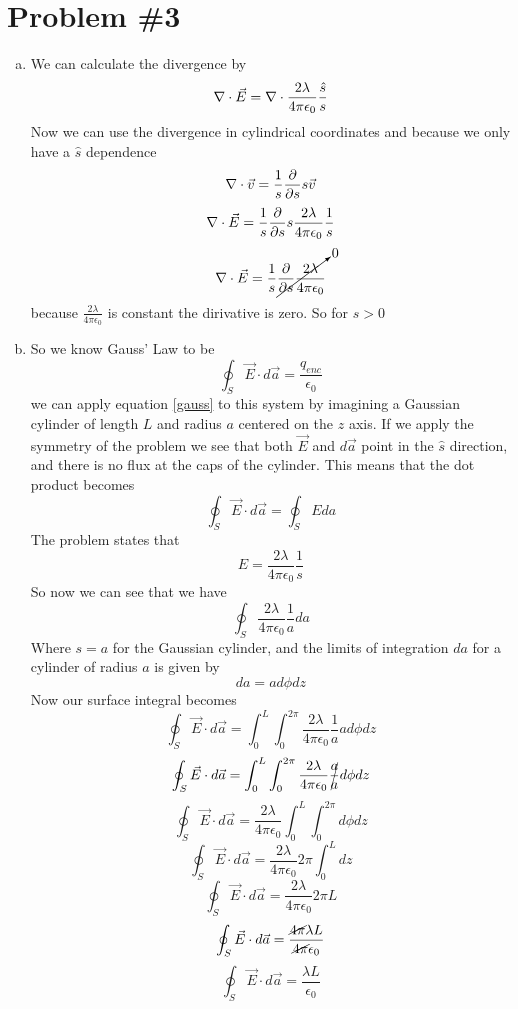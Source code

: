 \documentclass[11pt]{article}
\numberwithin{equation}{section}
\newcommand{\grad}{\bold\nabla}
\begin{document}
\section{Problem \#3}
\begin{enumerate}[(a)]
\item 
We can calculate the divergence by
$$\grad \cdot \vec{E} = \grad \cdot \frac{2\lambda}{4\pi\epsilon_0}\frac{\hat{s}}{s}$$
Now we can use the divergence in cylindrical coordinates and because we only have a $\hat{s}$ dependence 
$$\grad \cdot \vec{v} =  \frac{1}{s} \frac{\partial}{\partial s} s \vec{v}$$
$$\grad \cdot \vec{E} = \frac{1}{s}\frac{\partial}{\partial s}s \frac{2\lambda}{4\pi\epsilon_0}\frac{1}{s}$$
$$\grad \cdot \vec{E} = \frac{1}{s}\cancelto{0}{\frac{\partial}{\partial s} \frac{2\lambda}{4\pi\epsilon_0}}$$
because $\frac{2\lambda}{4\pi\epsilon_0}$ is constant the dirivative is zero. So for $s > 0$ 
\begin{center}
\fbox{$\grad \cdot \vec{E} = 0$}
\end{center}

\item 
So we know Gauss' Law to be
\begin{equation}
\oint_S \vec{E} \cdot d\vec{a} = \frac{q_{enc}}{\epsilon_0}
\label{gauss}
\end{equation}
we can apply equation \ref{gauss} to this system by imagining a Gaussian cylinder of length $L$ and radius $a$ centered on the $z$ axis. If we apply the symmetry of the problem we see that both $\vec{E}$ and $d\vec{a}$ point in the $\hat{s}$ direction, and there is no flux at the caps of the cylinder. This means that the dot product becomes
$$\oint_S \vec{E} \cdot d\vec{a} = \oint_S E da$$
The problem states that 
$$E = \frac{2\lambda}{4\pi \epsilon_0} \frac{1}{s}$$ 
So now we can see that we have
$$\oint_S \frac{2\lambda}{4\pi \epsilon_0} \frac{1}{a} da$$ 
Where $s=a$ for the Gaussian cylinder, and the limits of integration $da$ for a cylinder of radius $a$ is given by
$$da = ad\phi dz$$
Now our surface integral becomes
$$\oint_S \vec{E} \cdot d\vec{a} = \int_{0}^{L}\int_0^{2\pi} \frac{2\lambda}{4\pi \epsilon_0} \frac{1}{a} ad\phi dz$$
$$\oint_S \vec{E} \cdot d\vec{a} =\int_{0}^{L}\int_0^{2\pi} \frac{2\lambda}{4\pi \epsilon_0} \cancel{\frac{a}{a}} d\phi dz$$
$$\oint_S \vec{E} \cdot d\vec{a} =\frac{2\lambda}{4\pi \epsilon_0}\int_{0}^{L}\int_0^{2\pi}  d\phi dz$$
$$\oint_S \vec{E} \cdot d\vec{a} =\frac{2\lambda}{4\pi \epsilon_0}2\pi\int_{0}^{L} dz$$
$$\oint_S \vec{E} \cdot d\vec{a} =\frac{2\lambda}{4\pi \epsilon_0}2\pi L$$
$$\oint_S \vec{E} \cdot d\vec{a} =\frac{\cancel{4\pi}\lambda L}{\cancel{4\pi} \epsilon_0}$$
$$\oint_S \vec{E} \cdot d\vec{a} =\frac{\lambda L}{\epsilon_0}$$
 

\end{enumerate}
\end{document}
